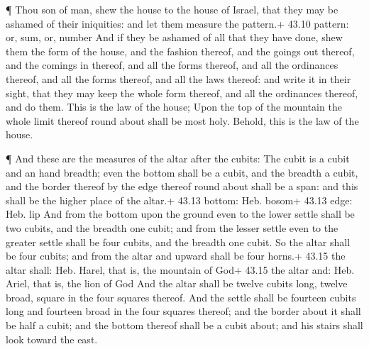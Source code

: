  ¶ Thou son of man, shew the house to the house of Israel,
that they may be ashamed of their iniquities: and let them measure the
pattern.+ 43.10 pattern: or, sum, or, number  And if they
be ashamed of all that they have done, shew them the form of the house,
and the fashion thereof, and the goings out thereof, and the comings in
thereof, and all the forms thereof, and all the ordinances thereof, and
all the forms thereof, and all the laws thereof: and write it in their
sight, that they may keep the whole form thereof, and all the ordinances
thereof, and do them.  This is the law of the house; Upon
the top of the mountain the whole limit thereof round about shall be
most holy. Behold, this is the law of the house.

 ¶ And these are the measures of the altar after the
cubits: The cubit is a cubit and an hand breadth; even the bottom shall
be a cubit, and the breadth a cubit, and the border thereof by the edge
thereof round about shall be a span: and this shall be the higher place
of the altar.+ 43.13 bottom: Heb. bosom+ 43.13 edge: Heb. lip
 And from the bottom upon the ground even to the lower
settle shall be two cubits, and the breadth one cubit; and from the
lesser settle even to the greater settle shall be four cubits, and the
breadth one cubit.  So the altar shall be four cubits; and
from the altar and upward shall be four horns.+ 43.15 the altar shall:
Heb. Harel, that is, the mountain of God+ 43.15 the altar and: Heb.
Ariel, that is, the lion of God  And the altar shall be
twelve cubits long, twelve broad, square in the four squares thereof.
 And the settle shall be fourteen cubits long and fourteen
broad in the four squares thereof; and the border about it shall be half
a cubit; and the bottom thereof shall be a cubit about; and his stairs
shall look toward the east.


